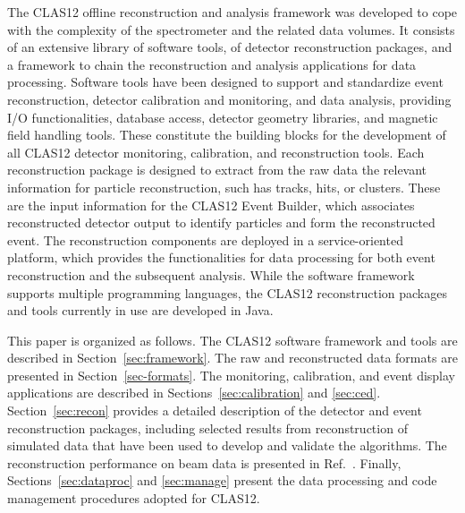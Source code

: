 The CLAS12 offline reconstruction and analysis framework was developed to cope with the complexity of the
spectrometer and the related data volumes. It consists of an extensive library of software tools, of detector
reconstruction packages, and a framework to chain the reconstruction and analysis applications for data
processing. Software tools have been designed to support and standardize event reconstruction, detector
calibration and monitoring, and data analysis, providing I/O functionalities, database access, detector geometry
libraries, and magnetic field handling tools. These constitute the building blocks for the development of all CLAS12
detector monitoring, calibration, and reconstruction tools. Each reconstruction package is designed to extract
from the raw data the relevant information for particle reconstruction, such has tracks, hits, or clusters. These
are the input information for the CLAS12 Event Builder, which associates reconstructed detector output to
identify particles and form the reconstructed event. The reconstruction components are deployed in a
service-oriented platform, which provides the functionalities for data processing for both event reconstruction
and the subsequent analysis. While the software framework supports multiple programming languages, the CLAS12
reconstruction packages and tools currently in use are developed in Java.

This paper is organized as follows. The CLAS12 software framework and tools are described in
Section~\ref{sec:framework}. The raw and reconstructed data formats are presented in Section~\ref{sec-formats}.
The monitoring, calibration, and event display applications are described in Sections~\ref{sec:calibration} and
\ref{sec:ced}. Section~\ref{sec:recon} provides a detailed description of the detector and event reconstruction
packages, including selected results from reconstruction of simulated data that have been used to develop and
validate the algorithms. The reconstruction performance on beam data is presented in Ref.~\cite{clas12-nim}.
Finally, Sections~\ref{sec:dataproc} and \ref{sec:manage} present the data processing and code management
procedures adopted for CLAS12.
